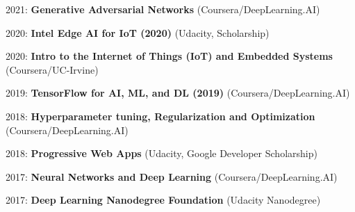 \begin{itemize*}
  \item 2021: \textbf{Generative Adversarial Networks} (Coursera/DeepLearning.AI)
  \item 2020: \textbf{Intel Edge AI for IoT (2020)} (Udacity, Scholarship)
  \item 2020: \textbf{Intro to the Internet of Things (IoT) and Embedded Systems} (Coursera/UC-Irvine)
  \item 2019: \textbf{TensorFlow for AI, ML, and DL (2019)} (Coursera/DeepLearning.AI)
  \item 2018: \textbf{Hyperparameter tuning, Regularization and Optimization} (Coursera/DeepLearning.AI)
  \item 2018: \textbf{Progressive Web Apps} (Udacity, Google Developer Scholarship)
  \item 2017: \textbf{Neural Networks and Deep Learning} (Coursera/DeepLearning.AI)
  \item 2017: \textbf{Deep Learning Nanodegree Foundation} (Udacity Nanodegree)
\end{itemize*}
